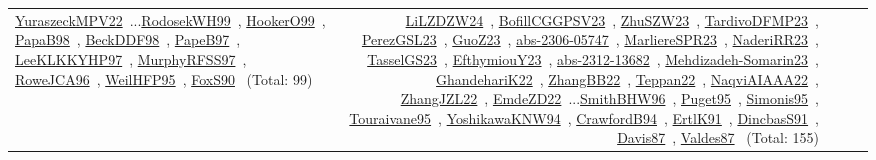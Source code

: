 {\begin{longtable}{p{3cm}r>{\raggedright\arraybackslash}p{6cm}>{\raggedright\arraybackslash}p{6cm}>{\raggedright\arraybackslash}p{8cm}}
\href{../works/YuraszeckMPV22.pdf}{YuraszeckMPV22}~\cite{YuraszeckMPV22}...\href{../works/RodosekWH99.pdf}{RodosekWH99}~\cite{RodosekWH99}, \href{../works/HookerO99.pdf}{HookerO99}~\cite{HookerO99}, \href{../works/PapaB98.pdf}{PapaB98}~\cite{PapaB98}, \href{../works/BeckDDF98.pdf}{BeckDDF98}~\cite{BeckDDF98}, \href{../works/PapeB97.pdf}{PapeB97}~\cite{PapeB97}, \href{../works/LeeKLKKYHP97.pdf}{LeeKLKKYHP97}~\cite{LeeKLKKYHP97}, \href{../works/MurphyRFSS97.pdf}{MurphyRFSS97}~\cite{MurphyRFSS97}, \href{../works/RoweJCA96.pdf}{RoweJCA96}~\cite{RoweJCA96}, \href{../works/WeilHFP95.pdf}{WeilHFP95}~\cite{WeilHFP95}, \href{../works/FoxS90.pdf}{FoxS90}~\cite{FoxS90} (Total: 99) & \href{../works/LiLZDZW24.pdf}{LiLZDZW24}~\cite{LiLZDZW24}, \href{../works/BofillCGGPSV23.pdf}{BofillCGGPSV23}~\cite{BofillCGGPSV23}, \href{../works/ZhuSZW23.pdf}{ZhuSZW23}~\cite{ZhuSZW23}, \href{../works/TardivoDFMP23.pdf}{TardivoDFMP23}~\cite{TardivoDFMP23}, \href{../works/PerezGSL23.pdf}{PerezGSL23}~\cite{PerezGSL23}, \href{../works/GuoZ23.pdf}{GuoZ23}~\cite{GuoZ23}, \href{../works/abs-2306-05747.pdf}{abs-2306-05747}~\cite{abs-2306-05747}, \href{../works/MarliereSPR23.pdf}{MarliereSPR23}~\cite{MarliereSPR23}, \href{../works/NaderiRR23.pdf}{NaderiRR23}~\cite{NaderiRR23}, \href{../works/TasselGS23.pdf}{TasselGS23}~\cite{TasselGS23}, \href{../works/EfthymiouY23.pdf}{EfthymiouY23}~\cite{EfthymiouY23}, \href{../works/abs-2312-13682.pdf}{abs-2312-13682}~\cite{abs-2312-13682}, \href{../works/Mehdizadeh-Somarin23.pdf}{Mehdizadeh-Somarin23}~\cite{Mehdizadeh-Somarin23}, \href{../works/GhandehariK22.pdf}{GhandehariK22}~\cite{GhandehariK22}, \href{../works/ZhangBB22.pdf}{ZhangBB22}~\cite{ZhangBB22}, \href{../works/Teppan22.pdf}{Teppan22}~\cite{Teppan22}, \href{../works/NaqviAIAAA22.pdf}{NaqviAIAAA22}~\cite{NaqviAIAAA22}, \href{../works/ZhangJZL22.pdf}{ZhangJZL22}~\cite{ZhangJZL22}, \href{../works/EmdeZD22.pdf}{EmdeZD22}~\cite{EmdeZD22}...\href{../works/SmithBHW96.pdf}{SmithBHW96}~\cite{SmithBHW96}, \href{../works/Puget95.pdf}{Puget95}~\cite{Puget95}, \href{../works/Simonis95.pdf}{Simonis95}~\cite{Simonis95}, \href{../works/Touraivane95.pdf}{Touraivane95}~\cite{Touraivane95}, \href{../works/YoshikawaKNW94.pdf}{YoshikawaKNW94}~\cite{YoshikawaKNW94}, \href{../works/CrawfordB94.pdf}{CrawfordB94}~\cite{CrawfordB94}, \href{../works/ErtlK91.pdf}{ErtlK91}~\cite{ErtlK91}, \href{../works/DincbasS91.pdf}{DincbasS91}~\cite{DincbasS91}, \href{../works/Davis87.pdf}{Davis87}~\cite{Davis87}, \href{../works/Valdes87.pdf}{Valdes87}~\cite{Valdes87} (Total: 155)\\
\end{longtable}
}

